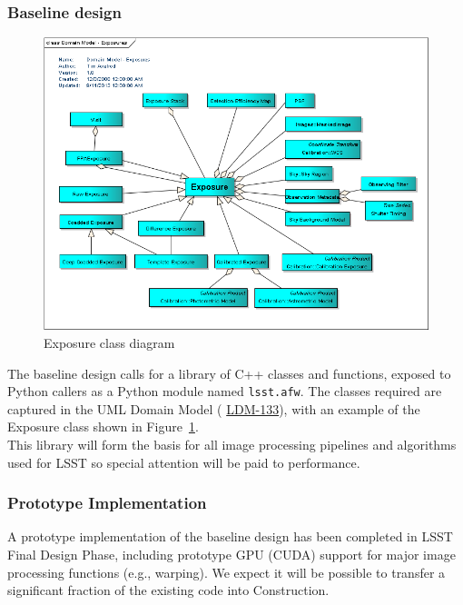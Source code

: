 \documentclass[12pt]{article}
\newcommand{\ds}[2]{{\color{blue} \href{https://docushare.lsstcorp.org/docushare/dsweb/Get/#1}{#2}}\xspace}
\newcommand{\appsUMLdomain}{\ds{LDM-133}{LDM-133}}
\begin{document}
\subsubsection{Baseline design}

\begin{figure}
\includegraphics[angle=0,scale=0.54]{domain_model_-_exposures.png}
\caption{Exposure class diagram\label{fig:exposureUML}}
\end{figure}

The baseline design calls for a library of C++ classes and functions, exposed to Python callers as a Python module named {\tt lsst.afw}. The classes required are captured in the UML Domain Model (\appsUMLdomain), with an example of the Exposure class shown in Figure~\ref{fig:exposureUML}.
\\

This library will form the basis for all image processing pipelines and algorithms used for LSST so special attention will be paid to performance.


\subsubsection{Prototype Implementation}

A prototype implementation of the baseline design has been completed in LSST Final Design Phase, including prototype GPU (CUDA) support for major image processing functions (e.g., warping). We expect it will be possible to transfer a significant fraction of the existing code into Construction.
\\
\end{document}
